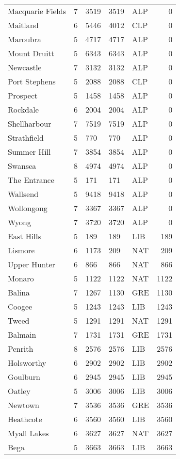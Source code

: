 \documentclass{article}
\begin{document}
\begin{center}
\begin{longtable}{lllllr}
Macquarie Fields & 7 & 3519 & 3519 & ALP & 0\\
Maitland & 6 & 5446 & 4012 & CLP & 0\\
Maroubra & 5 & 4717 & 4717 & ALP & 0\\
Mount Druitt & 5 & 6343 & 6343 & ALP & 0\\
Newcastle & 7 & 3132 & 3132 & ALP & 0\\
Port Stephens & 5 & 2088 & 2088 & CLP & 0\\
Prospect & 5 & 1458 & 1458 & ALP & 0\\
Rockdale & 6 & 2004 & 2004 & ALP & 0\\
Shellharbour & 7 & 7519 & 7519 & ALP & 0\\
Strathfield & 5 & 770 & 770 & ALP & 0\\
Summer Hill & 7 & 3854 & 3854 & ALP & 0\\
Swansea & 8 & 4974 & 4974 & ALP & 0\\
The Entrance & 5 & 171 & 171 & ALP & 0\\
Wallsend & 5 & 9418 & 9418 & ALP & 0\\
Wollongong & 7 & 3367 & 3367 & ALP & 0\\
Wyong & 7 & 3720 & 3720 & ALP & 0\\
\hline \hline
East Hills & 5 & 189 & 189 & LIB & 189\\
Lismore & 6 & 1173 & 209 & NAT & 209\\
Upper Hunter & 6 & 866 & 866 & NAT & 866\\
Monaro & 5 & 1122 & 1122 & NAT & 1122\\
Balina & 7 & 1267 & 1130 & GRE & 1130\\
Coogee & 5 & 1243 & 1243 & LIB & 1243\\
Tweed & 5 & 1291 & 1291 & NAT & 1291\\
Balmain & 7 & 1731 & 1731 & GRE & 1731\\
Penrith & 8 & 2576 & 2576 & LIB & 2576\\
Holsworthy & 6 & 2902 & 2902 & LIB & 2902\\
Goulburn & 6 & 2945 & 2945 & LIB & 2945\\
Oatley & 5 & 3006 & 3006 & LIB & 3006\\
Newtown & 7 & 3536 & 3536 & GRE & 3536\\
\hline \hline
Heathcote & 6 & 3560 & 3560 & LIB & 3560\\
Myall Lakes & 6 & 3627 & 3627 & NAT & 3627\\
Bega & 5 & 3663 & 3663 & LIB & 3663\\

\end{longtable}
\end{center}
\end{document}
